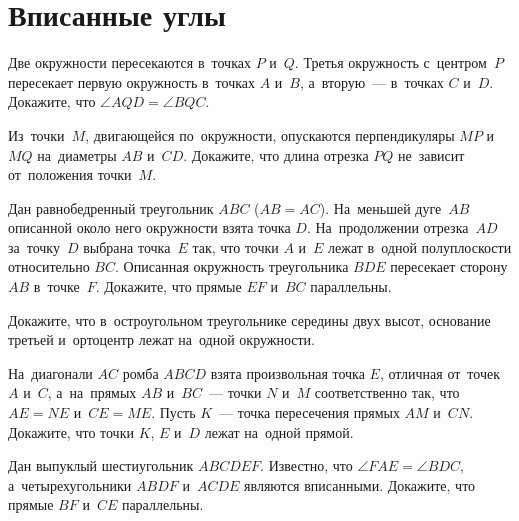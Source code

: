 
\section*{Вписанные углы}


\begin{problems}

\item
Две окружности пересекаются в~точках $P$ и~$Q$.
Третья окружность с~центром~$P$ пересекает первую окружность в~точках
$A$ и~$B$, а~вторую~--- в~точках $C$ и~$D$.
Докажите, что $\angle AQD = \angle BQC$.

\item
Из~точки~$M$, двигающейся по~окружности, опускаются перпендикуляры $MP$ и~$MQ$
на~диаметры $AB$ и~$CD$.
Докажите, что длина отрезка $PQ$ не~зависит от~положения точки~$M$.

\item
Дан равнобедренный треугольник $ABC$ ($AB = AC$).
На~меньшей дуге~$AB$ описанной около него окружности взята точка $D$.
На~продолжении отрезка~$AD$ за~точку~$D$ выбрана точка~$E$ так, что точки $A$
и~$E$ лежат в~одной полуплоскости относительно $BC$.
Описанная окружность треугольника $BDE$ пересекает сторону $AB$ в~точке~$F$.
Докажите, что прямые $EF$ и~$BC$ параллельны.


\item
Докажите, что в~остроугольном треугольнике середины двух высот, основание
третьей и~ортоцентр лежат на~одной окружности.

\item
На~диагонали $AC$ ромба $ABCD$ взята произвольная точка $E$, отличная от~точек
$A$ и~$C$, а~на~прямых $AB$ и~$BC$~--- точки $N$ и~$M$ соответственно так, что
$AE = NE$ и~$CE = ME$.
Пусть $K$~--- точка пересечения прямых $AM$ и~$CN$.
Докажите, что точки $K$, $E$ и~$D$ лежат на~одной прямой.

\item
Дан выпуклый шестиугольник $ABCDEF$.
Известно, что $\angle FAE = \angle BDC$, а~четырехугольники $ABDF$ и~$ACDE$
являются вписанными.
Докажите, что прямые $BF$ и~$CE$ параллельны.

\end{problems}

